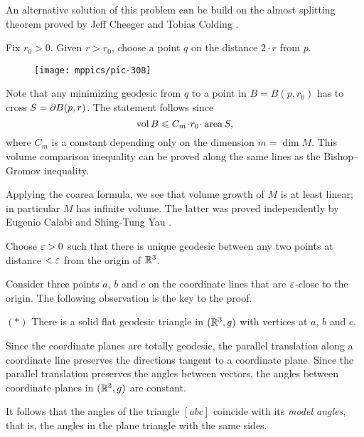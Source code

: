 An alternative solution of this problem can be build on the almost splitting theorem proved by  Jeff Cheeger and Tobias Colding \cite{cheeger-colding}.





Fix $r_0>0$.
Given $r>r_0$, choose a point $q$ on the distance $2\cdot r$ from $p$.

\begin{wrapfigure}{r}{35 mm}
\vskip-5mm
\centering
\texttt{[image: mppics/pic-308]}
\end{wrapfigure}

Note that any minimizing geodesic from $q$ to a point in $B=B(p,r_0)$
has to cross $S\z=\partial B(p,r)$.
The statement follows since  
\[\vol B\le C_m\cdot r_0\cdot \area S,\]
where $C_m$ is a constant depending only on the dimension $m=\dim M$.
This volume comparison inequality can be proved along the same lines as the Bishop--Gromov inequality.
\qeds


Applying the coarea formula, 
we see that volume growth of $M$ is at least linear; 
in particular $M$ has infinite volume.
The latter was proved independently 
by Eugenio Calabi 
and Shing-Tung Yau \cite{calabi,yau-ricci}.



Choose $\varepsilon>0$ such that there is unique geodesic between any two points at distance $<\varepsilon$ from the origin of $\mathbb{R}^3$.

Consider three points $a$, $b$ and $c$ on the coordinate lines that are $\varepsilon$-close 
to the origin.
The following observation is the key to the proof.

\begin{cl}{$({*})$}
There is a solid flat geodesic triangle in $(\mathbb{R}^3,g)$ with vertices at $a$, $b$ and $c$.
\end{cl}

Since the coordinate planes are totally geodesic, 
the parallel translation along a coordinate line preserves the directions tangent to a coordinate plane.
Since the parallel translation preserves the angles between vectors, the angles between coordinate planes in $(\mathbb{R}^3,g)$ are constant.

It follows that the angles of the triangle $[abc]$ coincide with its \emph{model angles},
that is, the angles in the plane triangle with the same sides.

